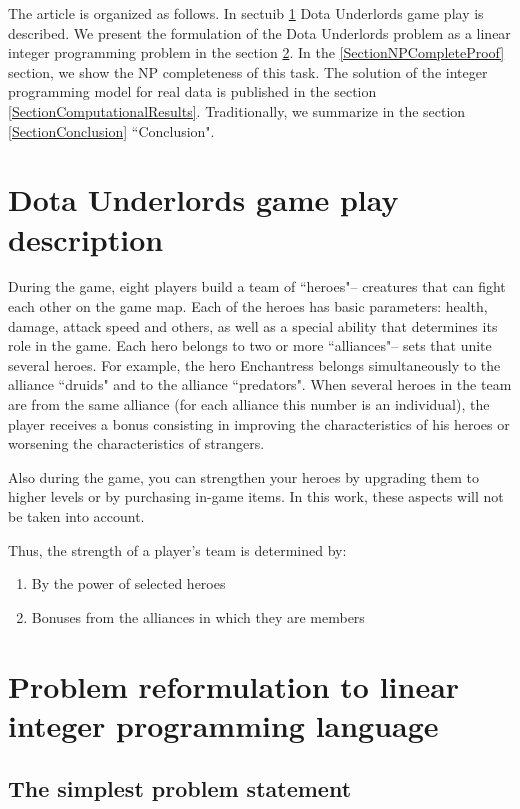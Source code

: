 \documentclass{article}
\begin{document}
The article is organized as follows. In sectuib \ref{SectionDUDescription} Dota Underlords game play is described.
We present the formulation of the Dota Underlords problem as a linear integer programming problem in the section \ref{SectionDUIP}. In the \ref{SectionNPCompleteProof} section, we show the NP completeness of this task. The solution of the integer programming model for real data is published in the section \ref{SectionComputationalResults}. Traditionally, we summarize in the section \ref{SectionConclusion} ``Conclusion".

\section{Dota Underlords game play description}
\label{SectionDUDescription}

During the game, eight players build a team of ``heroes"-- creatures that can fight each other on the game map. Each of the heroes has basic parameters: health, damage, attack speed and others, as well as a special ability that determines its role in the game. Each hero belongs to two or more ``alliances"-- sets that unite several heroes. For example, the hero Enchantress belongs simultaneously to the alliance ``druids" and to the alliance ``predators". When  several heroes in the team are from the same alliance (for each alliance this number is an individual), the player receives a bonus consisting in improving the characteristics of his heroes or worsening the characteristics of strangers.

Also during the game, you can strengthen your heroes by upgrading them to higher levels or by purchasing in-game items. In this work, these aspects will not be taken into account.

Thus, the strength of a player’s team is determined by:

\begin{enumerate}
    \item By the power of selected heroes
    \item Bonuses from the alliances in which they are members
\end{enumerate}


\section{Problem reformulation to linear integer programming language }
\label{SectionDUIP}

\subsection{The simplest problem statement}
\end{document}
